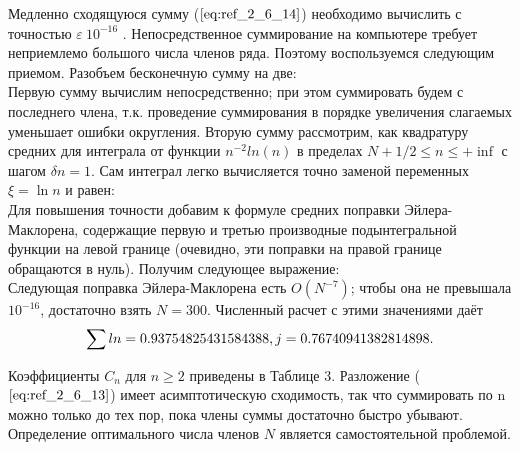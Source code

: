 Медленно сходящуюся сумму ($\ref{eq:ref_2_6_14}$) необходимо вычислить с точностью $\varepsilon~10^{-16}$ .
Непосредственное суммирование на компьютере требует неприемлемо
большого числа членов ряда. Поэтому воспользуемся следующим приемом.
Разобъем бесконечную сумму на две:
\begin{equation}
\label{eq:ref_2_6_15}
\end{equation}
Первую сумму вычислим непосредственно; при этом суммировать будем с
последнего члена, т.к. проведение суммирования в порядке увеличения
слагаемых уменьшает ошибки округления. Вторую сумму рассмотрим, как
квадратуру средних для интеграла от функции $n^{-2}ln(n)$ в пределах
$N + 1/ 2 \leqslant n \leqslant +\inf$ с шагом $\delta n=1$. Сам интеграл легко вычисляется точно
заменой переменных $\xi=\ln n $ и равен:
\begin{equation}
\label{eq:ref_2_6_16}
\end{equation}
Для повышения точности добавим к формуле средних поправки Эйлера-
Маклорена, содержащие первую и третью производные подынтегральной
функции на левой границе (очевидно, эти поправки на правой границе
обращаются в нуль). Получим следующее выражение:
\begin{equation}
\label{eq:ref_2_6_17}
\end{equation}
Следующая поправка Эйлера-Маклорена есть $O(N^{-7})$; чтобы она не превышала
$10^{-16}$, достаточно взять $N = 300$. Численный расчет с этими значениями даёт
\begin{equation}
\sum ln = 0.93754825431584388,
\\
j = 0.76740941382814898.
\label{eq:ref_2_6_18}
\end{equation}

Коэффициенты $C_n$ для $n \geqslant 2$ приведены в Таблице 3. Разложение ($\ref{eq:ref_2_6_13}$)
имеет асимптотическую сходимость, так что суммировать по n можно только
до тех пор, пока члены суммы достаточно быстро убывают. Определение
оптимального числа членов $N$ является самостоятельной проблемой.